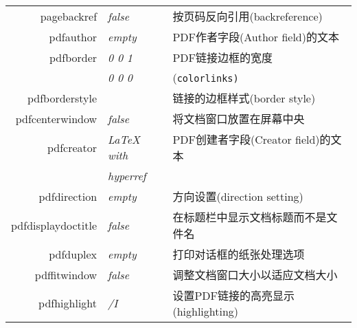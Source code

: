 \documentclass{article}
\begin{document}
\begin{longtable}{@{}>{\ttfamily}rlp{7cm}@{}}
  pagebackref                       & \textit{false}         & 按页码反向引用(backreference)                                                                          \\
  pdfauthor                         & \textit{empty}         & PDF作者字段(Author field)的文本                                                                        \\
  pdfborder                         & \textit{0 0 1}         & PDF链接边框的宽度                                                                                      \\
                                    & \textit{0 0 0}         & (\texttt{colorlinks)}                                                                           \\
  pdfborderstyle                    &                        & 链接的边框样式(border style)                                                                           \\
  pdfcenterwindow                   & \textit{false}         & 将文档窗口放置在屏幕中央                                                                                    \\
  pdfcreator                        & \textit{LaTeX with}    & PDF创建者字段(Creator field)的文本                                                                      \\
                                    & \textit{hyperref}      &                                                                                                 \\
  pdfdirection                      & \textit{empty}         & 方向设置(direction setting)                                                                         \\
  pdfdisplaydoctitle                & \textit{false}         & 在标题栏中显示文档标题而不是文件名                                                                               \\
  pdfduplex                         & \textit{empty}         & 打印对话框的纸张处理选项                                                                                    \\
  pdffitwindow                      & \textit{false}         & 调整文档窗口大小以适应文档大小                                                                                 \\
  pdfhighlight                      & \textit{/I}            & 设置PDF链接的高亮显示(highlighting)                                                                      \\

\end{longtable}
\end{document}
